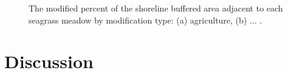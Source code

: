\documentclass[12pt]{article}\usepackage[]{graphicx}\usepackage[]{color}
\begin{document}
\begin{figure}[H]

{\centering {} 

}

\caption{The modified percent of the shoreline buffered area adjacent to each seagrass meadow by modification type: (a) agriculture, (b) ... .}\label{fig:percentmodpertype}
\end{figure}
\hypertarget{discussion}{%
\section{Discussion}\label{discussion}}
\end{document}
